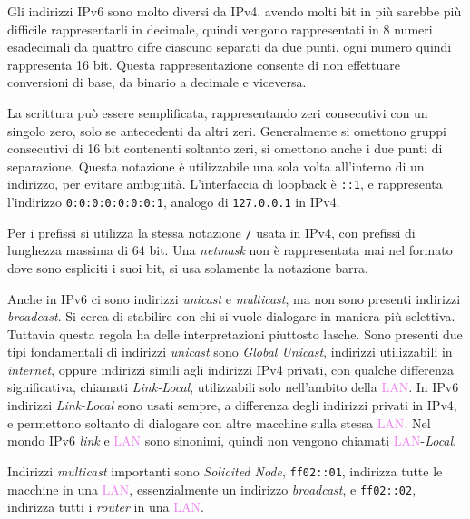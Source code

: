 \documentclass{article}
\numberwithin{equation}{subsection}
\begin{document}
Gli indirizzi \textcolor{OliveGreen}{IPv6} sono molto diversi da \textcolor{BurntOrange}{IPv4}, avendo molti bit in più sarebbe più difficile rappresentarli in decimale, quindi vengono rappresentati in 8 numeri 
esadecimali da quattro cifre ciascuno separati da due punti, ogni numero quindi rappresenta 16 bit. Questa rappresentazione consente di non effettuare conversioni di base, da binario a decimale e viceversa. 

La scrittura può essere semplificata, rappresentando zeri consecutivi con un singolo zero, solo se antecedenti da altri zeri. Generalmente si omettono 
gruppi consecutivi di 16 bit contenenti soltanto zeri, si omettono anche i due punti di separazione. Questa notazione è utilizzabile una sola volta all'interno di 
un indirizzo, per evitare ambiguità. L'interfaccia di loopback è \texttt{::1}, e rappresenta l'indirizzo \texttt{0:0:0:0:0:0:0:1}, analogo di \texttt{127.0.0.1} in \textcolor{BurntOrange}{IPv4}. 

Per i prefissi si utilizza la stessa notazione \texttt{/} usata in \textcolor{BurntOrange}{IPv4}, con prefissi di lunghezza massima di 64 bit. Una \textit{netmask} non è rappresentata mai nel formato dove 
sono espliciti i suoi bit, si usa solamente la notazione barra. 

Anche in \textcolor{OliveGreen}{IPv6} ci sono indirizzi \textit{unicast} e \textit{multicast}, ma non sono presenti indirizzi \textit{broadcast}. Si cerca di stabilire con chi si vuole dialogare in maniera più selettiva. Tuttavia questa regola ha delle interpretazioni piuttosto lasche. 
Sono presenti due tipi fondamentali di indirizzi \textit{unicast} sono \textit{Global  Unicast}, indirizzi utilizzabili in \textit{internet}, oppure indirizzi simili agli indirizzi \textcolor{BurntOrange}{IPv4} privati, con qualche differenza significativa, chiamati \textit{Link-Local}, utilizzabili solo nell'ambito della \textcolor{violet}{LAN}. 
In \textcolor{OliveGreen}{IPv6} indirizzi \textit{Link-Local} sono usati sempre, a differenza degli indirizzi privati in \textcolor{BurntOrange}{IPv4}, e permettono soltanto di dialogare con altre macchine sulla stessa \textcolor{violet}{LAN}. 
Nel mondo \textcolor{OliveGreen}{IPv6} \textit{link} e \textcolor{violet}{LAN} sono sinonimi, quindi non vengono chiamati \textcolor{violet}{LAN}-\textit{Local}. 

Indirizzi \textit{multicast} importanti sono \textit{Solicited Node}, \texttt{ff02::01}, indirizza tutte le macchine in una \textcolor{violet}{LAN}, essenzialmente un indirizzo \textit{broadcast}, e \texttt{ff02::02}, indirizza tutti i \textit{router} in 
una \textcolor{violet}{LAN}. 
\end{document}
